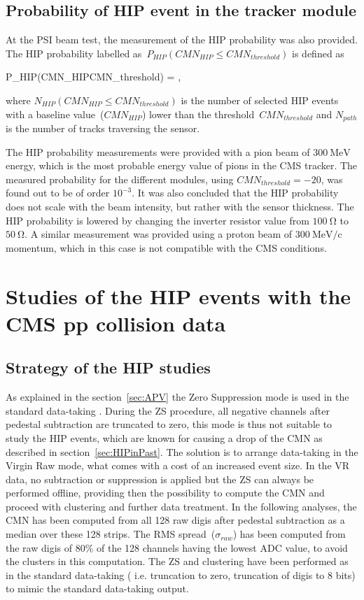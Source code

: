 \subsection{Probability of HIP event in the tracker module}

At the PSI beam test, the measurement of the HIP probability was also provided. The HIP probability labelled as~$P_{HIP}(CMN_{HIP}\leq CMN_{threshold})$ is defined as 

{
P_{HIP}(CMN_{HIP}\leq CMN_{threshold}) = ,
}

where $N_{HIP}(CMN_{HIP}\leq CMN_{threshold})$ is the number of selected HIP events with a baseline value~($CMN_{HIP}$) lower than the threshold~$CMN_{threshold}$ and $N_{path}$ is the number of tracks traversing the sensor.

The HIP probability measurements were provided with a pion beam of $300~\mathrm{MeV}$ energy, which is the most probable energy value of pions in the CMS tracker. The measured probability for the different modules, using $CMN_{threshold}=-20$, was found out to be of order $10^{-3}$. It was also concluded that the HIP probability does not scale with the beam intensity, but rather with the sensor thickness. The HIP probability is lowered by changing the inverter resistor value from $100~\mathrm{\Omega}$ to  $50~\mathrm{\Omega}$. A similar measurement was provided using a proton beam of  $300~\mathrm{MeV/c}$ momentum, which in this case is not compatible with the CMS conditions.


\section{Studies of the HIP events with the CMS pp collision data}

\subsection{Strategy of the HIP studies}

As explained in the section~\ref{sec:APV} the Zero Suppression mode is used in the standard data-taking . During the ZS procedure, all negative channels after pedestal subtraction are truncated to zero, this mode is thus not suitable to study the HIP events, which are known for causing a drop of the CMN as described in section~\ref{sec:HIPinPast}. The solution is to arrange data-taking in the Virgin Raw mode, what comes with a cost of an increased event size. In the VR data, no subtraction or suppression is applied but the ZS can always be performed offline, providing then the possibility to compute the CMN and proceed with clustering and further data treatment. In the following analyses, the CMN has been computed from all 128 raw digis after pedestal subtraction as a median over these 128 strips. The RMS spread~($\sigma_{raw}$) has been computed from the raw digis of 80\% of the 128 channels having the lowest ADC value, to avoid the clusters in this computation. The ZS and clustering have been performed as in the standard data-taking ( i.e. truncation to zero, truncation of digis to 8 bits) to mimic the standard data-taking output.

